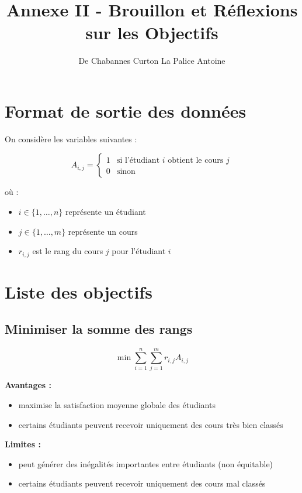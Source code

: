 \documentclass[11pt]{article}
\author{De Chabannes Curton La Palice Antoine}
\title{Annexe II - Brouillon et Réflexions sur les Objectifs}
\begin{document}
\maketitle


\section{Format de sortie des données}

On considère les variables suivantes :

\[
A_{i,j} =
\begin{cases}
1 & \text{si l'étudiant } i \text{ obtient le cours } j \\
0 & \text{sinon}
\end{cases}
\]

où :

\begin{itemize}
\item $i \in \{1,\dots,n\}$ représente un étudiant
\item $j \in \{1,\dots,m\}$ représente un cours
\item $r_{i,j}$ est le rang du cours $j$ pour l'étudiant $i$
\end{itemize}

\section{Liste des objectifs}

\subsection{Minimiser la somme des rangs}

\[
\min \sum_{i=1}^{n} \sum_{j=1}^{m} r_{i,j} A_{i,j}
\]

\textbf{Avantages :}

\begin{itemize}
\item maximise la satisfaction moyenne globale des étudiants
\item certains étudiants peuvent recevoir uniquement des cours très bien classés
\end{itemize}

\textbf{Limites :}

\begin{itemize}
\item peut générer des inégalités importantes entre étudiants (non équitable)
\item certains étudiants peuvent recevoir uniquement des cours mal classés
\end{itemize}
\end{document}
